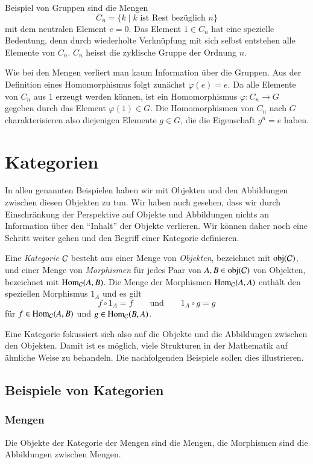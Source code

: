 Beispiel von Gruppen sind die Mengen 
\[
C_n = \{ k\;|\; \text{$k$ ist Rest bezüglich $n$}\}
\]
mit dem neutralen Element $e=0$.
Das Element $1\in C_n$ hat eine spezielle Bedeutung, denn durch
wiederholte Verknüpfung mit sich selbst entstehen alle Elemente von $C_n$.
$C_n$ heisst die zyklische Gruppe der Ordnung $n$.

Wie bei den Mengen verliert man kaum Information über die Gruppen.
Aus der Definition eines Homomorphismus folgt zunächst $\varphi(e)=e$.
Da alle Elemente von $C_n$ aus $1$ erzeugt werden können, ist 
ein Homomorphismus $\varphi\colon C_n\to G$ gegeben durch das 
Element $\varphi(1)\in G$.
Die Homomorphismen von $C_n$ nach $G$ charakterisieren also diejenigen
Elemente $g\in G$, die die Eigenschaft $g^n=e$ haben.

\section{Kategorien}
In allen genannten Beispielen haben wir mit Objekten und den Abbildungen
zwischen diesen Objekten zu tun.
Wir haben auch gesehen, dass wir durch Einschränkung der Perspektive auf
Objekte und Abbildungen nichts an Information über den ``Inhalt'' der
Objekte verlieren.
Wir können daher noch eine Schritt weiter gehen und den Begriff einer
Kategorie definieren.

\begin{definition}
Eine {\em Kategorie} $\cal C$ besteht aus einer Menge von {\em Objekten},
bezeichnet mit $\operatorname{obj}(\cal C)$, und einer Menge von
{\em Morphismen} für jedes Paar von $A,B\in\operatorname{obj}(\cal C)$ von
Objekten, bezeichnet mit
$\operatorname{Hom}_{\cal C}(A,B)$.
Die Menge der Morphismen $\operatorname{Hom}_{\cal C}(A,A)$
enthält den speziellen Morphismus $1_A$ und es gilt
\[
f\circ 1_A = f
\qquad\text{und}\qquad
1_A\circ g = g
\]
für
$f\in\operatorname{Hom}_{\cal C}(A,B)$
und
$g\in\operatorname{Hom}_{\cal C}(B,A)$.
\end{definition}

Eine Kategorie fokussiert sich also auf die Objekte und die Abbildungen 
zwischen den Objekten.
Damit ist es möglich, viele Strukturen in der Mathematik auf ähnliche
Weise zu behandeln.
Die nachfolgenden Beispiele sollen dies illustrieren.

\subsection{Beispiele von Kategorien}
\subsubsection{Mengen}
Die Objekte der Kategorie der Mengen sind die Mengen, die Morphismen
sind die Abbildungen zwischen Mengen.

